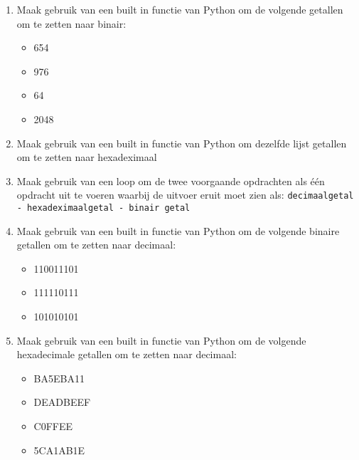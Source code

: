 \begin{enumerate}
\item Maak gebruik van een built in functie van Python om de volgende getallen om te zetten naar binair:
	\begin{itemize}
	\item 654
	\item 976
	\item 64
	\item 2048
	\end{itemize}
\item Maak gebruik van een built in functie van Python om dezelfde lijst getallen om te zetten naar hexadeximaal
\item Maak gebruik van een loop om de twee voorgaande opdrachten als \'e\'en opdracht uit te voeren waarbij de uitvoer eruit moet zien als: \texttt{decimaalgetal - hexadeximaalgetal - binair getal}
\item Maak gebruik van een built in functie van Python om de volgende binaire getallen om te zetten naar decimaal:
	\begin{itemize}
	\item 110011101
	\item 111110111
	\item 101010101
	\end{itemize}
\item Maak gebruik van een built in functie van Python om de volgende hexadecimale getallen om te zetten naar decimaal:
	\begin{itemize}
	\item BA5EBA11
	\item DEADBEEF
	\item C0FFEE
	\item 5CA1AB1E
	\end{itemize}
\end{enumerate}

